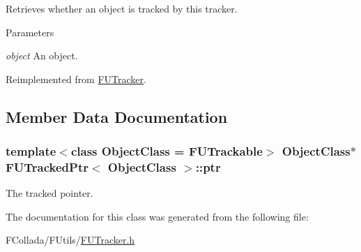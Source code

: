 \label{classFUTrackedPtr_a8715a735d43ad08ecae5b716b3833433}
Retrieves whether an object is tracked by this tracker. 
\begin{DoxyParams}{Parameters}
\item[{\em object}]An object. \end{DoxyParams}


Reimplemented from \hyperlink{classFUTracker_ab58cddea7242921a4b9e6c07dfd64b11}{FUTracker}.



\subsection{Member Data Documentation}
\hypertarget{classFUTrackedPtr_aa7964388a4365d5823467848dd5de579}{
\subsubsection[{ptr}]{\setlength{\rightskip}{0pt plus 5cm}template$<$class ObjectClass = FUTrackable$>$ ObjectClass$\ast$ {\bf FUTrackedPtr}$<$ ObjectClass $>$::{\bf ptr}}}
\label{classFUTrackedPtr_aa7964388a4365d5823467848dd5de579}
The tracked pointer. 

The documentation for this class was generated from the following file:\begin{DoxyCompactItemize}
\item 
FCollada/FUtils/\hyperlink{FUTracker_8h}{FUTracker.h}\end{DoxyCompactItemize}
